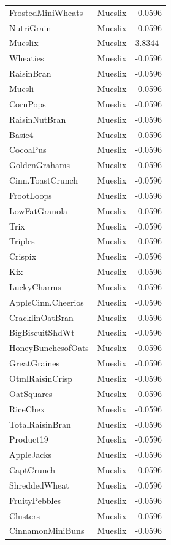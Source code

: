 \begin{table}[!htbp]
\begin{tabular}{lll}
FrostedMiniWheats & Mueslix & -0.0596
\\
NutriGrain & Mueslix & -0.0596
\\
Mueslix & Mueslix & 3.8344
\\
Wheaties & Mueslix & -0.0596
\\
RaisinBran & Mueslix & -0.0596
\\
Muesli & Mueslix & -0.0596
\\
CornPops & Mueslix & -0.0596
\\
RaisinNutBran & Mueslix & -0.0596
\\
Basic4 & Mueslix & -0.0596
\\
CocoaPus & Mueslix & -0.0596
\\
GoldenGrahams & Mueslix & -0.0596
\\
Cinn.ToastCrunch & Mueslix & -0.0596
\\
FrootLoops & Mueslix & -0.0596
\\
LowFatGranola & Mueslix & -0.0596
\\
Trix & Mueslix & -0.0596
\\
Triples & Mueslix & -0.0596
\\
Crispix & Mueslix & -0.0596
\\
Kix & Mueslix & -0.0596
\\
LuckyCharms & Mueslix & -0.0596
\\
AppleCinn.Cheerios & Mueslix & -0.0596
\\
CracklinOatBran & Mueslix & -0.0596
\\
BigBiscuitShdWt & Mueslix & -0.0596
\\
HoneyBunchesofOats & Mueslix & -0.0596
\\
GreatGraines & Mueslix & -0.0596
\\
OtmlRaisinCrisp & Mueslix & -0.0596
\\
OatSquares & Mueslix & -0.0596
\\
RiceChex & Mueslix & -0.0596
\\
TotalRaisinBran & Mueslix & -0.0596
\\
Product19 & Mueslix & -0.0596
\\
AppleJacks & Mueslix & -0.0596
\\
CaptCrunch & Mueslix & -0.0596
\\
ShreddedWheat & Mueslix & -0.0596
\\
FruityPebbles & Mueslix & -0.0596
\\
Clusters & Mueslix & -0.0596
\\
CinnamonMiniBuns & Mueslix & -0.0596
\\

\end{tabular}
\end{table}
